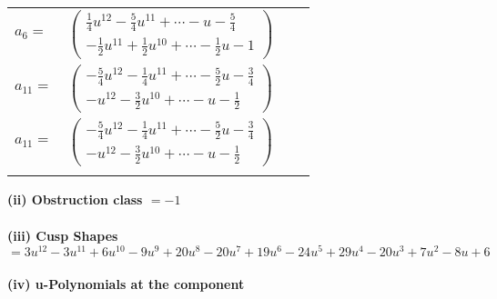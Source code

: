 \documentclass[1p]{elsarticle_modified}
\theoremstyle{definition}
\begin{document}
\begin{tabular}{m{7pt} m{180pt} m{7pt} m{180pt} }
\flushright $a_{6}=$&$\begin{pmatrix}\frac{1}{4} u^{12}-\frac{5}{4} u^{11}+\cdots- u-\frac{5}{4}\\-\frac{1}{2} u^{11}+\frac{1}{2} u^{10}+\cdots-\frac{1}{2} u-1\end{pmatrix}$ \\
\flushright $a_{11}=$&$\begin{pmatrix}-\frac{5}{4} u^{12}-\frac{1}{4} u^{11}+\cdots-\frac{5}{2} u-\frac{3}{4}\\- u^{12}-\frac{3}{2} u^{10}+\cdots- u-\frac{1}{2}\end{pmatrix}$\\ \flushright $a_{11}=$&$\begin{pmatrix}-\frac{5}{4} u^{12}-\frac{1}{4} u^{11}+\cdots-\frac{5}{2} u-\frac{3}{4}\\- u^{12}-\frac{3}{2} u^{10}+\cdots- u-\frac{1}{2}\end{pmatrix}$\\&\end{tabular}
\flushleft \textbf{(ii) Obstruction class $= -1$}\\~\\
\flushleft \textbf{(iii) Cusp Shapes $= 3 u^{12}-3 u^{11}+6 u^{10}-9 u^9+20 u^8-20 u^7+19 u^6-24 u^5+29 u^4-20 u^3+7 u^2-8 u+6$}\\~\\
\newpage\renewcommand{\arraystretch}{1}
\flushleft \textbf{(iv) u-Polynomials at the component}\newline \\
\end{document}

